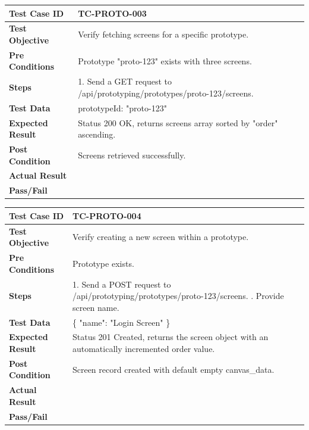 \begin{longtable}{|p{}|p{}|}
\hline
\textbf{Test Case ID} & TC-PROTO-003 \\ \hline
\textbf{Test Objective} & Verify fetching screens for a specific prototype. \\ \hline
\textbf{Pre Conditions} & Prototype "proto-123" exists with three screens. \\ \hline
\textbf{Steps} & 
1. Send a GET request to /api/prototyping/prototypes/proto-123/screens. \\ \hline
\textbf{Test Data} & prototypeId: "proto-123" \\ \hline
\textbf{Expected Result} & Status 200 OK, returns screens array sorted by "order" ascending. \\ \hline
\textbf{Post Condition} & Screens retrieved successfully. \\ \hline
\textbf{Actual Result} &  \\ \hline
\textbf{Pass/Fail} &  \\ \hline
\end{longtable}

\begin{longtable}{|p{}|p{}|}
\hline
\textbf{Test Case ID} & TC-PROTO-004 \\ \hline
\textbf{Test Objective} & Verify creating a new screen within a prototype. \\ \hline
\textbf{Pre Conditions} & Prototype exists. \\ \hline
\textbf{Steps} & 
1. Send a POST request to /api/prototyping/prototypes/proto-123/screens. \newline
2. Provide screen name. \\ \hline
\textbf{Test Data} & \{ "name": "Login Screen" \} \\ \hline
\textbf{Expected Result} & Status 201 Created, returns the screen object with an automatically incremented order value. \\ \hline
\textbf{Post Condition} & Screen record created with default empty canvas\_data. \\ \hline
\textbf{Actual Result} &  \\ \hline
\textbf{Pass/Fail} &  \\ \hline
\end{longtable}


